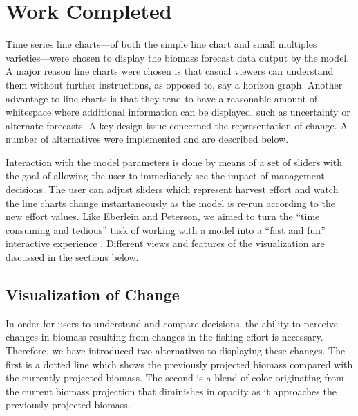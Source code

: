 \chapter{Work Completed}

Time series line charts---of both the simple line chart and small multiples varieties---were chosen to display the biomass forecast data output by the model.  A major reason line charts were chosen is that casual viewers can understand them without further instructions, as opposed to, say a horizon graph.  Another advantage to line charts is that they tend to have a reasonable amount of whitespace where additional information can be displayed, such as uncertainty or alternate forecasts. A key design issue concerned the representation of change.  A number of alternatives were implemented and are described below.

Interaction with the model parameters is done by means of a set of sliders with the goal of allowing the user to immediately see the impact of management decisions.  The user can adjust sliders which represent harvest effort and watch the line charts change instantaneously as the model is re-run according to the new effort values.  Like Eberlein and Peterson, we aimed to turn the ``time consuming and tedious'' task of working with a model into a ``fast and fun'' interactive experience \cite{eberlein1992}.  Different views and features of the visualization are discussed in the sections below.  


\section{Visualization of Change}

In order for users to understand and compare decisions, the ability to perceive changes in biomass resulting from changes in the fishing effort is necessary.  Therefore, we have introduced two alternatives to displaying these changes.  The first is a dotted line which shows the previously projected biomass compared with the currently projected biomass.  The second is a blend of color originating from the current biomass projection that diminishes in opacity as it approaches the previously projected biomass.


